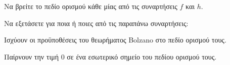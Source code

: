 \begin{alist}
\item Να βρείτε το πεδίο ορισμού κάθε μίας από τις συναρτήσεις $f$ και $h$. 
\item Να εξετάσετε για ποια ή ποιες από τις παραπάνω συναρτήσεις:
\begin{rlist}
\item Ισχύουν οι προϋποθέσεις του θεωρήματος Bolzano στο πεδίο ορισμού τους. 
\item Παίρνουν την τιμή 0 σε ένα εσωτερικό σημείο του πεδίου ορισμού τους. 
\end{rlist}
\end{alist}